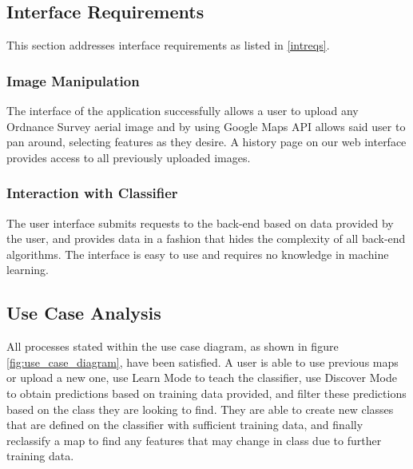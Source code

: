 \subsection{Interface Requirements}
This section addresses interface requirements as listed in \ref{intreqs}.

\subsubsection{Image Manipulation}
The interface of the application successfully allows a user to upload any Ordnance Survey aerial image and by using Google Maps API allows said user to pan around, selecting features as they desire. A history page on our web interface provides access to all previously uploaded images.

\subsubsection{Interaction with Classifier}
The user interface submits requests to the back-end based on data provided by the user, and provides data in a fashion that hides the complexity of all back-end algorithms. The interface is easy to use and requires no knowledge in machine learning.

\subsection{Use Case Analysis}
All processes stated within the use case diagram, as shown in figure \ref{fig:use_case_diagram}, have been satisfied. A user is able to use previous maps or upload a new one, use Learn Mode to teach the classifier, use Discover Mode to obtain predictions based on training data provided, and filter these predictions based on the class they are looking to find. They are able to create new classes that are defined on the classifier with sufficient training data, and finally reclassify a map to find any features that may change in class due to further training data.
